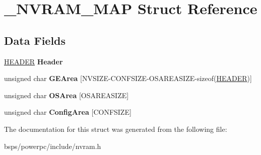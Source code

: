 \hypertarget{struct__NVRAM__MAP}{}\section{\+\_\+\+N\+V\+R\+A\+M\+\_\+\+M\+AP Struct Reference}
\label{struct__NVRAM__MAP}
\subsection*{Data Fields}
\begin{DoxyCompactItemize}
\item 
\mbox{\label{struct__NVRAM__MAP_ae7e6e9a5c217a3d376cbb97a559b942d}} 
\mbox{\hyperlink{struct__HEADER}{H\+E\+A\+D\+ER}} {\bfseries Header}
\item 
\mbox{\label{struct__NVRAM__MAP_ac018cdc47bbdf4c00c364d4557976b52}} 
unsigned char {\bfseries G\+E\+Area} \mbox{[}N\+V\+S\+I\+ZE-\/C\+O\+N\+F\+S\+I\+ZE-\/O\+S\+A\+R\+E\+A\+S\+I\+ZE-\/sizeof(\mbox{\hyperlink{struct__HEADER}{H\+E\+A\+D\+ER}})\mbox{]}
\item 
\mbox{\label{struct__NVRAM__MAP_ad0245b58171d79a148e17381f51570a9}} 
unsigned char {\bfseries O\+S\+Area} \mbox{[}O\+S\+A\+R\+E\+A\+S\+I\+ZE\mbox{]}
\item 
\mbox{\label{struct__NVRAM__MAP_a9471a1b43f395b1503446e7a149a11f6}} 
unsigned char {\bfseries Config\+Area} \mbox{[}C\+O\+N\+F\+S\+I\+ZE\mbox{]}
\end{DoxyCompactItemize}


The documentation for this struct was generated from the following file\+:\begin{DoxyCompactItemize}
\item 
bsps/powerpc/include/nvram.\+h\end{DoxyCompactItemize}
